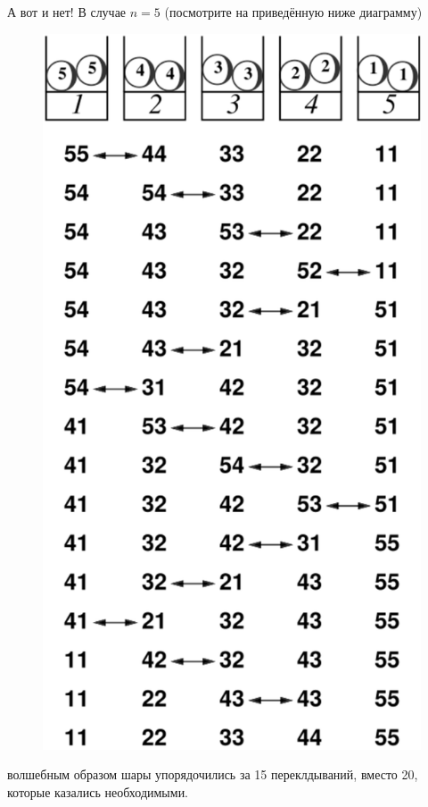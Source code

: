 А вот и нет!
В случае $n = 5$ (посмотрите на приведённую ниже диаграмму)
\begin{figure}[h!]
\centering
\includegraphics[scale=0.5]{Figs/UnsolvedPuzzles/5bin}
\end{figure}
волшебным образом шары упорядочились за 15 переклдываний, вместо 20, которые казались необходимыми.


